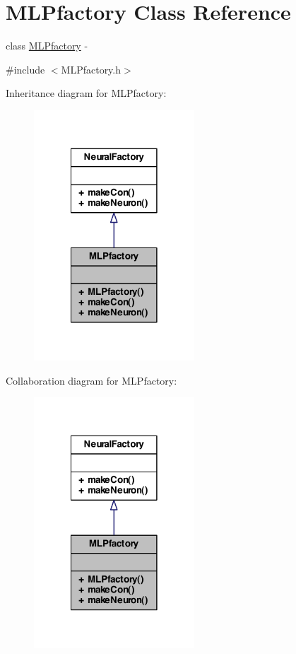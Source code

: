 \hypertarget{class_m_l_pfactory}{
\section{MLPfactory Class Reference}
\label{class_m_l_pfactory}
}


class \hyperlink{class_m_l_pfactory}{MLPfactory} -\/  




{\ttfamily \#include $<$MLPfactory.h$>$}



Inheritance diagram for MLPfactory:
\nopagebreak
\begin{figure}[H]
\begin{center}
\leavevmode
\includegraphics[width=170pt]{class_m_l_pfactory__inherit__graph}
\end{center}
\end{figure}


Collaboration diagram for MLPfactory:
\nopagebreak
\begin{figure}[H]
\begin{center}
\leavevmode
\includegraphics[width=170pt]{class_m_l_pfactory__coll__graph}
\end{center}
\end{figure}
